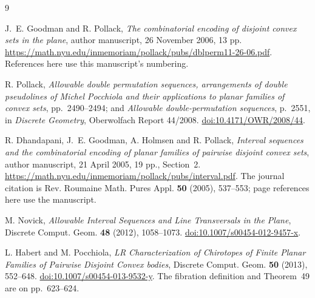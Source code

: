\documentclass[11pt]{article}
\begin{document}
\begin{thebibliography}{9}

J.~E. Goodman and R. Pollack,
\emph{The combinatorial encoding of disjoint convex sets in the plane},
author manuscript, 26 November 2006, 13 pp.
\url{https://math.nyu.edu/inmemoriam/pollack/pubs/dblperm11-26-06.pdf}.
References here use this manuscript's numbering.

R. Pollack,
\emph{Allowable double permutation sequences, arrangements of double
pseudolines of Michel Pocchiola and their applications to planar families
of convex sets}, pp.~2490--2494; and
\emph{Allowable double-permutation sequences}, p.~2551,
in \emph{Discrete Geometry}, Oberwolfach Report 44/2008.
\href{https://doi.org/10.4171/OWR/2008/44}{doi:10.4171/OWR/2008/44}.

R. Dhandapani, J.~E. Goodman, A. Holmsen and R. Pollack,
\emph{Interval sequences and the combinatorial encoding of planar
families of pairwise disjoint convex sets},
author manuscript, 21 April 2005, 19 pp., Section~2.
\url{https://math.nyu.edu/inmemoriam/pollack/pubs/interval.pdf}.
The journal citation is Rev. Roumaine Math. Pures Appl.
\textbf{50} (2005), 537--553; page references here use the manuscript.

M. Novick,
\emph{Allowable Interval Sequences and Line Transversals in the Plane},
Discrete Comput. Geom. \textbf{48} (2012), 1058--1073.
\href{https://doi.org/10.1007/s00454-012-9457-x}{doi:10.1007/s00454-012-9457-x}.

L. Habert and M. Pocchiola,
\emph{LR Characterization of Chirotopes of Finite Planar Families of
Pairwise Disjoint Convex bodies},
Discrete Comput. Geom. \textbf{50} (2013), 552--648.
\href{https://doi.org/10.1007/s00454-013-9532-y}{doi:10.1007/s00454-013-9532-y}.
The fibration definition and Theorem~49 are on pp.~623--624.

\end{thebibliography}
\end{document}
